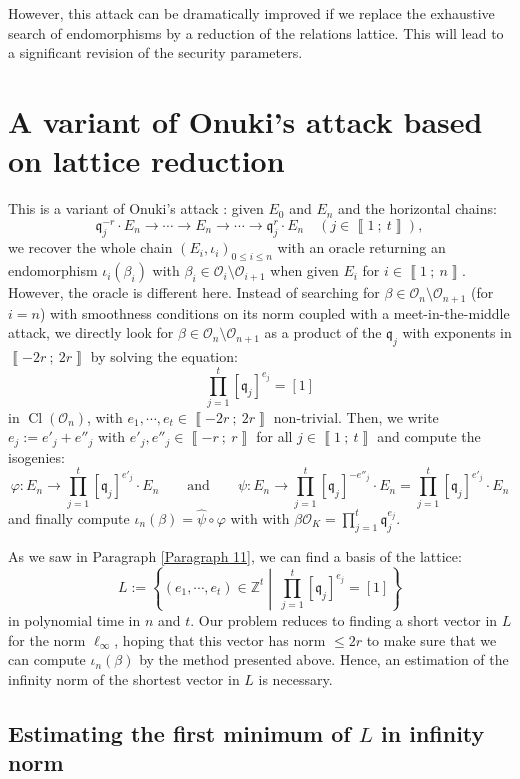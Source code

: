 \documentclass[a4paper,10pt,notitlepage]{report}
\theoremstyle{definition}
\theoremstyle{plain}
\theoremstyle{definition}
\newcommand{\Z}{\mathbb{Z}}
\newcommand{\mO}{\mathcal{O}}
\renewcommand{\i}[2]{\left\llbracket #1~;~#2\right\rrbracket}
\renewcommand{\(}{\left(}
\renewcommand{\)}{\right)}
\newcommand{\mf}[1]{\mathfrak{#1}}
\DeclareMathOperator{\Cl}{Cl}
\begin{document}
However, this attack can be dramatically improved if we replace the exhaustive search of endomorphisms by a reduction of the relations lattice. This will lead to a significant revision of the security parameters.

\section{A variant of Onuki's attack based on lattice reduction}\label{Paragraph 9}

This is a variant of Onuki's attack : given $E_0$ and $E_n$ and the horizontal chains:
\[\mf{q}_j^{-r}\cdot E_n\longrightarrow \cdots \longrightarrow E_n\longrightarrow \cdots\longrightarrow \mf{q}_j^{r}\cdot E_n \quad (j\in\i{1}{t}),\]
we recover the whole chain $(E_i,\iota_i)_{0\leq i\leq n}$ with an oracle returning an endomorphism $\iota_i(\beta_i)$ with $\beta_i\in\mO_i\setminus\mO_{i+1}$ when given $E_i$ for $i\in\i{1}{n}$. However, the oracle is different here.  Instead of searching for $\beta\in\mO_n\setminus\mO_{n+1}$ (for $i=n$) with smoothness conditions on its norm coupled with a meet-in-the-middle attack, we directly look for $\beta\in\mO_n\setminus\mO_{n+1}$ as a product of the $\mf{q}_j$ with exponents in $\i{-2r}{2r}$ by solving the equation:
\[\prod_{j=1}^t[\mf{q}_j]^{e_j}=[1]\]
in $\Cl(\mO_n)$, with $e_1,\cdots, e_t\in\i{-2r}{2r}$ non-trivial.  Then, we write $e_j:=e'_j+e''_j$ with $e'_j,e''_j\in\i{-r}{r}$ for all $j\in\i{1}{t}$ and compute the isogenies:
\[\varphi : E_n \longrightarrow \prod_{j=1}^t[\mf{q}_j]^{e'_j}\cdot E_n \qquad \mbox{and} \qquad \psi : E_n  \longrightarrow  \prod_{j=1}^t[\mf{q}_j]^{-e''_j}\cdot E_n=\prod_{j=1}^t[\mf{q}_j]^{e'_j}\cdot E_n\]
and finally compute $\iota_n(\beta)=\hat{\psi}\circ\varphi$ with with $\beta\mO_K= \prod_{j=1}^t\mf{q}_j^{e_j}$.

As we saw in Paragraph \ref{Paragraph 11}, we can find a basis of the lattice:
\[L:=\left\{(e_1,\cdots,e_t)\in\Z^t\middle| \  \prod_{j=1}^t[\mf{q}_j]^{e_j}=[1]\right\}\]
in polynomial time in $n$ and $t$.  Our problem reduces to finding a short vector in $L$ for the norm $\ell_\infty$, hoping that this vector has norm $\leq 2r$ to make sure that we can compute $\iota_n(\beta)$ by the method presented above.  Hence,  an estimation of the infinity norm of the shortest vector in $L$ is necessary.

\subsection{Estimating the first minimum of $L$ in infinity norm}
\end{document}
